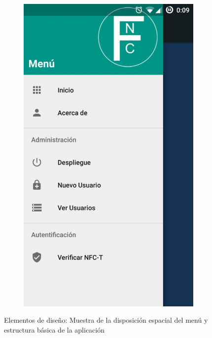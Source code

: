 \documentclass[../PFC.tex]{subfiles}
\begin{document}
\begin{figure}[H]
\begin{subfigure}{0.4\textwidth}
    \end{subfigure}          
    \qquad\qquad\qquad  %
    \begin{subfigure}{0.4\textwidth}  
       \centering
       \includegraphics[scale=0.45]{./img/menuDesplegado}
    \end{subfigure}   
  \caption{Elementos de diseño: Muestra de la disposición espacial del menú y estructura básica de la aplicación}
  \label{img:designElements}
\end{figure}
\end{document}
